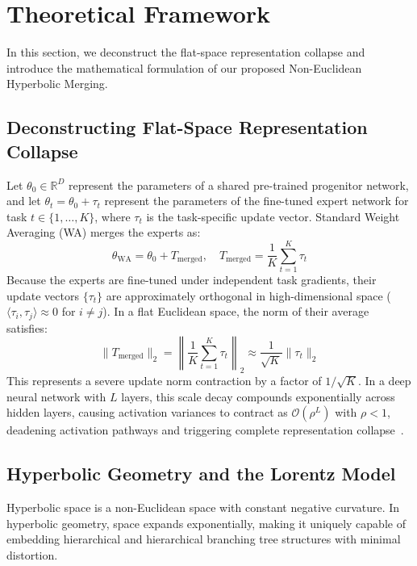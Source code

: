 \documentclass{article}
\theoremstyle{plain}
\theoremstyle{definition}
\theoremstyle{remark}
\begin{document}
\section{Theoretical Framework}
\label{sec:theory}
In this section, we deconstruct the flat-space representation collapse and introduce the mathematical formulation of our proposed Non-Euclidean Hyperbolic Merging.

\subsection{Deconstructing Flat-Space Representation Collapse}
Let $\theta_0 \in \mathbb{R}^D$ represent the parameters of a shared pre-trained progenitor network, and let $\theta_t = \theta_0 + \tau_t$ represent the parameters of the fine-tuned expert network for task $t \in \{1, \dots, K\}$, where $\tau_t$ is the task-specific update vector. Standard Weight Averaging (WA) merges the experts as:
\begin{equation}
\theta_{\text{WA}} = \theta_0 + T_{\text{merged}}, \quad T_{\text{merged}} = \frac{1}{K} \sum_{t=1}^K \tau_t
\end{equation}
Because the experts are fine-tuned under independent task gradients, their update vectors $\{\tau_t\}$ are approximately orthogonal in high-dimensional space ($\langle \tau_i, \tau_j \rangle \approx 0$ for $i \neq j$). In a flat Euclidean space, the norm of their average satisfies:
\begin{equation}
\|T_{\text{merged}}\|_2 = \left\| \frac{1}{K} \sum_{t=1}^K \tau_t \right\|_2 \approx \frac{1}{\sqrt{K}} \|\tau_t\|_2
\end{equation}
This represents a severe update norm contraction by a factor of $1/\sqrt{K}$. In a deep neural network with $L$ layers, this scale decay compounds exponentially across hidden layers, causing activation variances to contract as $\mathcal{O}(\rho^L)$ with $\rho < 1$, deadening activation pathways and triggering complete representation collapse~\cite{anonymous2026qcot, anonymous2026deconstruction}.

\subsection{Hyperbolic Geometry and the Lorentz Model}
Hyperbolic space is a non-Euclidean space with constant negative curvature. In hyperbolic geometry, space expands exponentially, making it uniquely capable of embedding hierarchical and hierarchical branching tree structures with minimal distortion.
\end{document}
